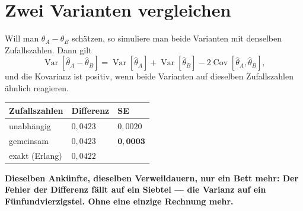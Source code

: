 \section{Zwei Varianten vergleichen}

\begin{merksatz}
Will man $\theta_A - \theta_B$ schätzen, so simuliere man beide Varianten mit denselben Zufallszahlen. Dann gilt
\[ \operatorname{Var}[\hat\theta_A - \hat\theta_B] = \operatorname{Var}[\hat\theta_A] + \operatorname{Var}[\hat\theta_B] - 2\operatorname{Cov}[\hat\theta_A,\hat\theta_B] , \]
und die Kovarianz ist positiv, wenn beide Varianten auf dieselben Zufallszahlen ähnlich reagieren.

\begin{center}
{\small
\renewcommand{\arraystretch}{1.48}
\begin{tabular}{@{}P{3.6cm}P{2.6cm}P{2.0cm}@{}}
\toprule
\textbf{Zufallszahlen} & \textbf{Differenz} & \textbf{SE}\\
\midrule
unabhängig & $0{,}0423$ & $0{,}0020$\\
gemeinsam & $0{,}0423$ & $\mathbf{0{,}0003}$\\
\midrule
exakt (Erlang) & $0{,}0422$ & \\
\bottomrule
\end{tabular}}
\end{center}

\begin{center}
\begin{minipage}{0.9\textwidth}
\textbf{Dieselben Ankünfte, dieselben Verweildauern, nur ein Bett mehr: Der Fehler der Differenz fällt auf ein Siebtel --- die Varianz auf ein Fünfundvierzigstel. Ohne eine einzige Rechnung mehr.}
\end{minipage}
\end{center}

\begin{center}
\begin{minipage}{0.88\textwidth}
\end{minipage}
\end{center}
\end{merksatz}

